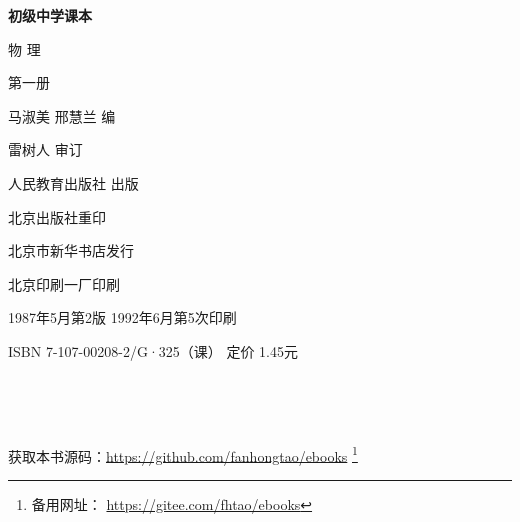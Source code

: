 \begin{titlepage}
    \begin{center}
        \vspace*{3cm}

        {\Large \textbf{初级中学课本} }

        \vspace{1cm}

        {\Huge 物 \qquad 理}

        \vspace{1.5cm}

        {\Large 第一册}


        \vspace{1cm}
        {\Large 马淑美 \qquad 邢慧兰 \quad 编}

        \vspace{0.5cm}
        {\Large 雷树人 \quad 审订}

        \vfill

        人民教育出版社 出版

        北京出版社重印

        北京市新华书店发行

        北京印刷一厂印刷

        1987年5月第2版  \qquad 1992年6月第5次印刷

        ISBN 7-107-00208-2/G·325（课） \quad 定价 1.45元

        \,

        \,

        获取本书源码：\url{https://github.com/fanhongtao/ebooks} \footnote{备用网址： \url{https://gitee.com/fhtao/ebooks} }
    \end{center}
 \end{titlepage}

